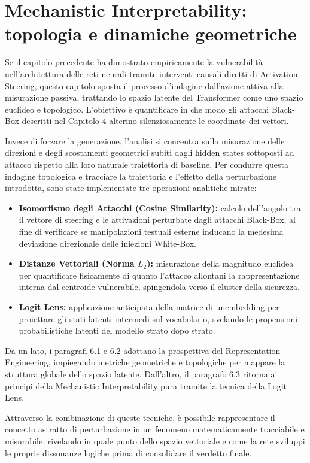 \chapter{Mechanistic Interpretability: topologia e dinamiche geometriche}

Se il capitolo precedente ha dimostrato empiricamente la vulnerabilità nell'architettura delle reti neurali tramite interventi causali diretti di Activation Steering, questo capitolo sposta il processo d'indagine dall'azione attiva alla misurazione passiva, trattando lo spazio latente del Transformer come uno spazio euclideo e topologico. L'obiettivo è quantificare in che modo gli attacchi Black-Box descritti nel Capitolo 4 alterino silenziosamente le coordinate dei vettori.

Invece di forzare la generazione, l'analisi si concentra sulla misurazione delle direzioni e degli scostamenti geometrici subiti dagli hidden states sottoposti ad attacco rispetto alla loro naturale traiettoria di baseline. Per condurre questa indagine topologica e tracciare la traiettoria e l'effetto della perturbazione introdotta, sono state implementate tre operazioni analitiche mirate:

\begin{itemize}[noitemsep]
    \item \textbf{Isomorfismo degli Attacchi (Cosine Similarity):} calcolo dell'angolo tra il vettore di steering e le attivazioni perturbate dagli attacchi Black-Box, al fine di verificare se manipolazioni testuali esterne inducano la medesima deviazione direzionale delle iniezioni White-Box.
    \item \textbf{Distanze Vettoriali (Norma $L_2$):} misurazione della magnitudo euclidea per quantificare fisicamente di quanto l'attacco allontani la rappresentazione interna dal centroide vulnerabile, spingendola verso il cluster della sicurezza.
    \item \textbf{Logit Lens:} applicazione anticipata della matrice di unembedding per proiettare gli stati latenti intermedi sul vocabolario, svelando le propensioni probabilistiche latenti del modello strato dopo strato.
\end{itemize}

Da un lato, i paragrafi 6.1 e 6.2 adottano la prospettiva del Representation Engineering, impiegando metriche geometriche e topologiche per mappare la struttura globale dello spazio latente. Dall'altro, il paragrafo 6.3 ritorna ai principi della Mechanistic Interpretability pura tramite la tecnica della Logit Lens.

Attraverso la combinazione di queste tecniche, è possibile rappresentare il concetto astratto di perturbazione in un fenomeno matematicamente tracciabile e misurabile, rivelando in quale punto dello spazio vettoriale e come la rete sviluppi le proprie dissonanze logiche prima di consolidare il verdetto finale.




